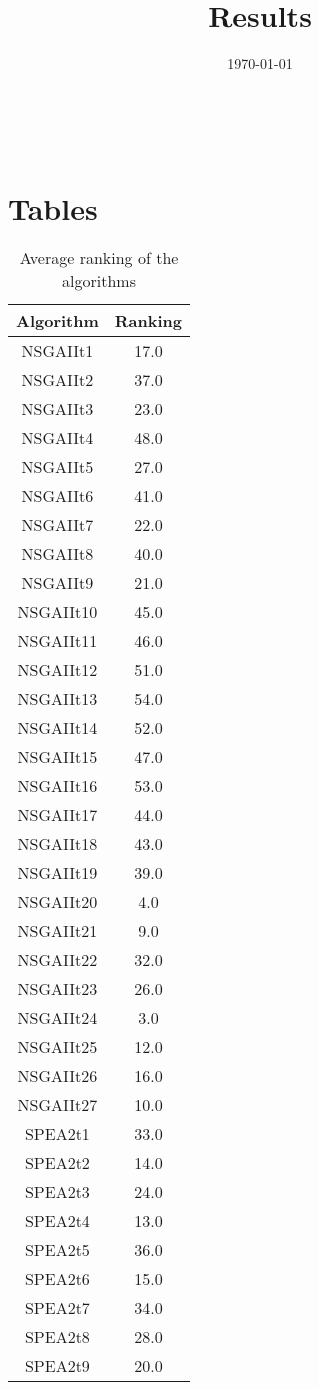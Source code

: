 \documentclass{article}
\title{Results}
\author{}
\date{\today}
\begin{document}
\oddsidemargin 0in \topmargin 0in\maketitle
\
\section{Tables}
\begin{table}[!htp]
\centering
\caption{Average ranking of the algorithms}
\begin{tabular}{c|c}
Algorithm&Ranking\\
\hline
NSGAIIt1&17.0\\
NSGAIIt2&37.0\\
NSGAIIt3&23.0\\
NSGAIIt4&48.0\\
NSGAIIt5&27.0\\
NSGAIIt6&41.0\\
NSGAIIt7&22.0\\
NSGAIIt8&40.0\\
NSGAIIt9&21.0\\
NSGAIIt10&45.0\\
NSGAIIt11&46.0\\
NSGAIIt12&51.0\\
NSGAIIt13&54.0\\
NSGAIIt14&52.0\\
NSGAIIt15&47.0\\
NSGAIIt16&53.0\\
NSGAIIt17&44.0\\
NSGAIIt18&43.0\\
NSGAIIt19&39.0\\
NSGAIIt20&4.0\\
NSGAIIt21&9.0\\
NSGAIIt22&32.0\\
NSGAIIt23&26.0\\
NSGAIIt24&3.0\\
NSGAIIt25&12.0\\
NSGAIIt26&16.0\\
NSGAIIt27&10.0\\
SPEA2t1&33.0\\
SPEA2t2&14.0\\
SPEA2t3&24.0\\
SPEA2t4&13.0\\
SPEA2t5&36.0\\
SPEA2t6&15.0\\
SPEA2t7&34.0\\
SPEA2t8&28.0\\
SPEA2t9&20.0\\

\end{tabular}
\end{table}
\end{document}
